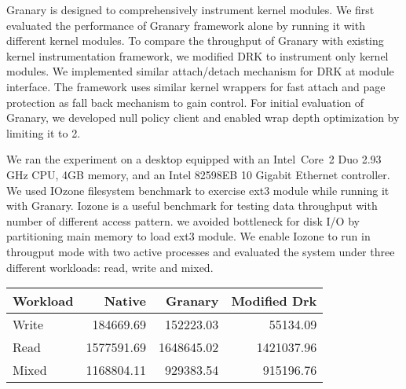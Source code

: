Granary is designed to comprehensively instrument kernel modules. We first evaluated the performance of Granary framework alone by running it with different kernel modules. To compare the throughput of Granary with existing kernel instrumentation framework, we modified DRK to instrument only kernel modules. We implemented similar attach/detach mechanism for DRK at module interface. The framework uses similar kernel wrappers for fast attach and page protection as fall back mechanism to gain control. For initial evaluation of Granary, we developed null policy client and enabled wrap depth optimization by limiting it to 2. 

We ran the experiment on a desktop equipped with an Intel\textregistered\ Core\texttrademark\ 2 Duo 2.93 GHz CPU, 4GB memory, and an Intel 82598EB 10 Gigabit Ethernet controller. We used IOzone filesystem benchmark to exercise ext3 module while running it with Granary. Iozone is a useful benchmark for testing data throughput with number of different access pattern. we avoided bottleneck for disk I/O by partitioning main memory to load ext3 module. We enable Iozone to run in througput mode with two active processes and evaluated the system under three different workloads: read, write and mixed.


\begin{table}[thp!]
\centering
\begin{tabular}{l r r r}
\hline\hline
Workload & Native & Granary & Modified Drk  \\ [0.5ex]
\hline
Write & 184669.69 & 152223.03 & 55134.09 \\
Read & 1577591.69 & 1648645.02 & 1421037.96 \\

Mixed & 1168804.11 & 929383.54 & 915196.76 \\[1ex]
\hline
\end{tabular}
\label{table:nonlin}
\end{table}


